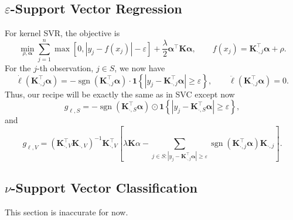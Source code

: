 \documentclass[11pt]{article}
\newcommand{\bK}{\bm{K}}
\newcommand{\balpha}{\bm{\alpha}}
\DeclareMathOperator{\sign}{sgn}
\begin{document}
\subsection{\(\varepsilon\)-Support Vector Regression}
For kernel SVR, the objective is 
\begin{equation}
\min_{\rho,\balpha}\sum_{j=1}^{n}\max\left[0, |y_j-f(x_j)|-\varepsilon\right]+\frac{\lambda}{2}\balpha^\top\bK\balpha, \qquad f(x_j)=\bK_{\cdot,j}^\top\balpha+\rho.
\end{equation} 
For the \(j\)-th observation, \(j\in S\), we now have \[\dot{\ell}(\bK_{\cdot,j}^\top\balpha)=-\sign\left(\bK_{\cdot,j}^\top\balpha\right)\cdot\bm{1}\left\{\left|y_j-\bK_{\cdot,j}^\top\balpha\right|\geq\varepsilon\right\},\qquad\ddot{\ell}(\bK_{\cdot,j}^\top\balpha)=0.\] Thus, our recipe will be exactly the same as in SVC except now \[g_{\ell, S}=-\sign\left(\bK_{\cdot,S}^\top\balpha\right)\odot\bm{1}\left\{\left|y_j-\bK_{\cdot,S}^\top\balpha\right|\geq\varepsilon\right\},\] and \[g_{\ell, V}=\left(\bK_{\cdot,V}^\top\bK_{\cdot,V}\right)^{-1}\bK_{\cdot,V}^\top\left[\lambda\bK\alpha-\sum_{j\in S:\left|y_j-\bK_{\cdot,j}^\top\balpha\right|\geq\varepsilon}\sign\left(\bK_{\cdot,j}^\top\balpha\right)\bK_{\cdot,j}\right].\]

\subsection{\(\nu\)-Support Vector Classification}
This section is inaccurate for now.
\end{document}
